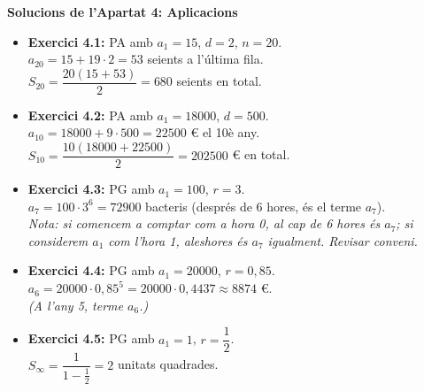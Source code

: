 \documentclass[12pt]{article}
\begin{document}
\begin{solucio}
\textbf{Solucions de l'Apartat 4: Aplicacions}
\begin{itemize}
    \item \textbf{Exercici 4.1:} PA amb $a_1 = 15$, $d = 2$, $n = 20$. \\
    $a_{20} = 15 + 19 \cdot 2 = 53$ seients a l'última fila. \\
    $S_{20} = \dfrac{20(15+53)}{2} = 680$ seients en total.
    
    \item \textbf{Exercici 4.2:} PA amb $a_1 = 18000$, $d = 500$. \\
    $a_{10} = 18000 + 9 \cdot 500 = 22500$ € el 10è any. \\
    $S_{10} = \dfrac{10(18000+22500)}{2} = 202500$ € en total.
    
    \item \textbf{Exercici 4.3:} PG amb $a_1 = 100$, $r = 3$. \\
    $a_7 = 100 \cdot 3^6 = 72900$ bacteris (després de 6 hores, és el terme $a_7$). \\
    \emph{Nota: si comencem a comptar com a hora 0, al cap de 6 hores és $a_7$; si considerem $a_1$ com l'hora 1, aleshores és $a_7$ igualment. Revisar conveni.}
    
    \item \textbf{Exercici 4.4:} PG amb $a_1 = 20000$, $r = 0{,}85$. \\
    $a_6 = 20000 \cdot 0{,}85^5 = 20000 \cdot 0{,}4437 \approx 8874 \text{ €}$. \\
    \emph{(A l'any 5, terme $a_6$.)}
    
    \item \textbf{Exercici 4.5:} PG amb $a_1 = 1$, $r = \dfrac{1}{2}$. \\
    $S_\infty = \dfrac{1}{1 - \frac{1}{2}} = 2$ unitats quadrades.
\end{itemize}
\end{solucio}
\end{document}
